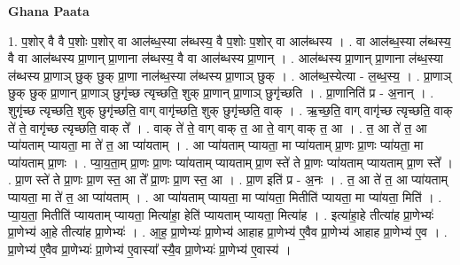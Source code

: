 \documentclass[17pt]{extarticle}
\begin{document}
\textbf{Ghana Paata } \newline

1. प॒शोर् वै वै प॒शोः प॒शोर् वा आल॑ब्ध॒स्या ल॑ब्धस्य॒ वै प॒शोः प॒शोर् वा आल॑ब्धस्य । . वा आल॑ब्ध॒स्या ल॑ब्धस्य॒ वै वा आल॑ब्धस्य प्रा॒णान् प्रा॒णाना ल॑ब्धस्य॒ वै वा आल॑ब्धस्य प्रा॒णान् । . आल॑ब्धस्य प्रा॒णान् प्रा॒णाना ल॑ब्ध॒स्या ल॑ब्धस्य प्रा॒णाञ् छुक् छुक् प्रा॒णा नाल॑ब्ध॒स्या ल॑ब्धस्य प्रा॒णाञ् छुक् । . आल॑ब्ध॒स्येत्या - ल॒ब्ध॒स्य॒ । . प्रा॒णाञ् छुक् छुक् प्रा॒णान् प्रा॒णाञ् छुगृ॑च्छ त्यृच्छति॒ शुक् प्रा॒णान् प्रा॒णाञ् छुगृ॑च्छति । . प्रा॒णानिति॑ प्र - अ॒नान् । . शुगृ॑च्छ त्यृच्छति॒ शुक् छुगृ॑च्छति॒ वाग् वागृ॑च्छति॒ शुक् छुगृ॑च्छति॒ वाक् । . ऋ॒च्छ॒ति॒ वाग् वागृ॑च्छ त्यृच्छति॒ वाक् ते॑ ते॒ वागृ॑च्छ त्यृच्छति॒ वाक् ते᳚ । . वाक् ते॑ ते॒ वाग् वाक् त॒ आ ते॒ वाग् वाक् त॒ आ । . त॒ आ ते॑ त॒ आ प्या॑यताम् प्यायता॒ मा ते॑ त॒ आ प्या॑यताम् । . आ प्या॑यताम् प्यायता॒ मा प्या॑यताम् प्रा॒णः प्रा॒णः प्या॑यता॒ मा प्या॑यताम् प्रा॒णः । . प्या॒य॒ता॒म् प्रा॒णः प्रा॒णः प्या॑यताम् प्यायताम् प्रा॒ण स्ते॑ ते प्रा॒णः प्या॑यताम् प्यायताम् प्रा॒ण स्ते᳚ । . प्रा॒ण स्ते॑ ते प्रा॒णः प्रा॒ण स्त॒ आ ते᳚ प्रा॒णः प्रा॒ण स्त॒ आ । . प्रा॒ण इति॑ प्र - अ॒नः । . त॒ आ ते॑ त॒ आ प्या॑यताम् प्यायता॒ मा ते॑ त॒ आ प्या॑यताम् । . आ प्या॑यताम् प्यायता॒ मा प्या॑यता॒ मितीति॑ प्यायता॒ मा प्या॑यता॒ मिति॑ । . प्या॒य॒ता॒ मितीति॑ प्यायताम् प्यायता॒ मित्या॑हा॒ हेति॑ प्यायताम् प्यायता॒ मित्या॑ह । . इत्या॑हा॒हे तीत्या॑ह प्रा॒णेभ्यः॑ प्रा॒णेभ्य॑ आ॒हे तीत्या॑ह प्रा॒णेभ्यः॑ । . आ॒ह॒ प्रा॒णेभ्यः॑ प्रा॒णेभ्य॑ आहाह प्रा॒णेभ्य॑ ए॒वैव प्रा॒णेभ्य॑ आहाह प्रा॒णेभ्य॑ ए॒व । . प्रा॒णेभ्य॑ ए॒वैव प्रा॒णेभ्यः॑ प्रा॒णेभ्य॑ ए॒वास्या᳚ स्यै॒व प्रा॒णेभ्यः॑ प्रा॒णेभ्य॑ ए॒वास्य॑ । \newline
\end{document}
